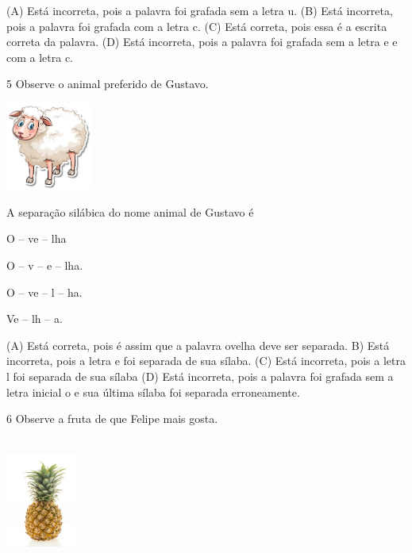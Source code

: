 (A) Está incorreta, pois a palavra foi grafada sem a letra u.
(B) Está incorreta, pois a palavra foi grafada com a letra c.
(C) Está correta, pois essa é a escrita correta da palavra.
(D) Está incorreta, pois a palavra foi grafada sem a letra e e com a letra c.

\num{5} Observe o animal preferido de Gustavo.

\includegraphics[width=1.11458in,height=1.13889in]{media/image142.jpeg}


A separação silábica do nome animal de Gustavo é

\begin{minipage}{.5\textwidth}
\begin{escolha}
\item O -- ve -- lha

\item O -- v -- e -- lha.

\item O -- ve -- l -- ha.

\item Ve -- lh -- a.
\end{escolha}
\end{minipage}

(A) Está correta, pois é assim que a palavra ovelha deve ser separada.
B) Está incorreta, pois a letra e foi separada de sua sílaba.
(C) Está incorreta, pois a letra l foi separada de sua sílaba
(D) Está incorreta, pois a palavra foi grafada sem a letra inicial o e sua última sílaba foi separada erroneamente.

\num{6} Observe a fruta de que Felipe mais gosta.

\includegraphics[width=0.94236in,height=1.64306in]{media/image143.jpeg}

